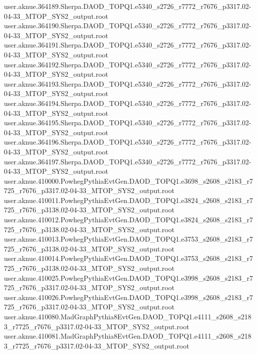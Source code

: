 {user.aknue.364189.Sherpa.DAOD_TOPQ1.e5340_s2726_r7772_r7676_p3317.02-04-33_MTOP_SYS2_output.root\\
user.aknue.364190.Sherpa.DAOD_TOPQ1.e5340_s2726_r7772_r7676_p3317.02-04-33_MTOP_SYS2_output.root\\
user.aknue.364191.Sherpa.DAOD_TOPQ1.e5340_s2726_r7772_r7676_p3317.02-04-33_MTOP_SYS2_output.root\\
user.aknue.364192.Sherpa.DAOD_TOPQ1.e5340_s2726_r7772_r7676_p3317.02-04-33_MTOP_SYS2_output.root\\
user.aknue.364193.Sherpa.DAOD_TOPQ1.e5340_s2726_r7772_r7676_p3317.02-04-33_MTOP_SYS2_output.root\\
user.aknue.364194.Sherpa.DAOD_TOPQ1.e5340_s2726_r7772_r7676_p3317.02-04-33_MTOP_SYS2_output.root\\
user.aknue.364195.Sherpa.DAOD_TOPQ1.e5340_s2726_r7772_r7676_p3317.02-04-33_MTOP_SYS2_output.root\\
user.aknue.364196.Sherpa.DAOD_TOPQ1.e5340_s2726_r7772_r7676_p3317.02-04-33_MTOP_SYS2_output.root\\
user.aknue.364197.Sherpa.DAOD_TOPQ1.e5340_s2726_r7772_r7676_p3317.02-04-33_MTOP_SYS2_output.root\\
user.aknue.410000.PowhegPythiaEvtGen.DAOD_TOPQ1.e3698_s2608_s2183_r7725_r7676_p3317.02-04-33_MTOP_SYS2_output.root\\
user.aknue.410011.PowhegPythiaEvtGen.DAOD_TOPQ1.e3824_s2608_s2183_r7725_r7676_p3138.02-04-33_MTOP_SYS2_output.root\\
user.aknue.410012.PowhegPythiaEvtGen.DAOD_TOPQ1.e3824_s2608_s2183_r7725_r7676_p3138.02-04-33_MTOP_SYS2_output.root\\
user.aknue.410013.PowhegPythiaEvtGen.DAOD_TOPQ1.e3753_s2608_s2183_r7725_r7676_p3138.02-04-33_MTOP_SYS2_output.root\\
user.aknue.410014.PowhegPythiaEvtGen.DAOD_TOPQ1.e3753_s2608_s2183_r7725_r7676_p3138.02-04-33_MTOP_SYS2_output.root\\
user.aknue.410025.PowhegPythiaEvtGen.DAOD_TOPQ1.e3998_s2608_s2183_r7725_r7676_p3317.02-04-33_MTOP_SYS2_output.root\\
user.aknue.410026.PowhegPythiaEvtGen.DAOD_TOPQ1.e3998_s2608_s2183_r7725_r7676_p3317.02-04-33_MTOP_SYS2_output.root\\
user.aknue.410080.MadGraphPythia8EvtGen.DAOD_TOPQ1.e4111_s2608_s2183_r7725_r7676_p3317.02-04-33_MTOP_SYS2_output.root\\
user.aknue.410081.MadGraphPythia8EvtGen.DAOD_TOPQ1.e4111_s2608_s2183_r7725_r7676_p3317.02-04-33_MTOP_SYS2_output.root\\
}
